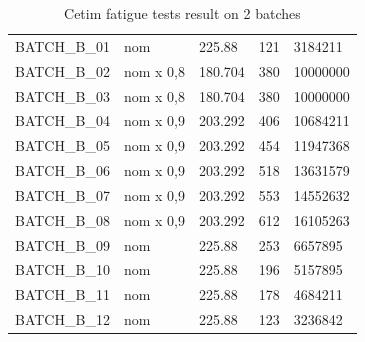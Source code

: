 \documentclass[3p,times,number,review]{elsarticle}
\begin{document}
\begin{table}[!h]
\begin{tabular}{lllll}
		BATCH\_B\_01      & nom                & 225.88                               & 121                                      & 3184211                              \\
		BATCH\_B\_02      & nom x 0,8          & 180.704                              & 380                                      & 10000000                             \\
		BATCH\_B\_03      & nom x 0,8          & 180.704                              & 380                                      & 10000000                             \\
		BATCH\_B\_04      & nom x 0,9          & 203.292                              & 406                                      & 10684211                             \\
		BATCH\_B\_05      & nom x 0,9          & 203.292                              & 454                                      & 11947368                             \\
		BATCH\_B\_06      & nom x 0,9          & 203.292                              & 518                                      & 13631579                             \\
		BATCH\_B\_07      & nom x 0,9          & 203.292                              & 553                                      & 14552632                             \\
		BATCH\_B\_08      & nom x 0,9          & 203.292                              & 612                                      & 16105263                             \\
		BATCH\_B\_09      & nom                & 225.88                               & 253                                      & 6657895                              \\
		BATCH\_B\_10      & nom                & 225.88                               & 196                                      & 5157895                              \\
		BATCH\_B\_11      & nom                & 225.88                               & 178                                      & 4684211                              \\
		BATCH\_B\_12      & nom                & 225.88                               & 123                                      & 3236842                              \\ \hline
	\end{tabular}
	\caption{Cetim fatigue tests result on 2 batches}
\label{tab:Cetim}
\end{table}
\end{document}
